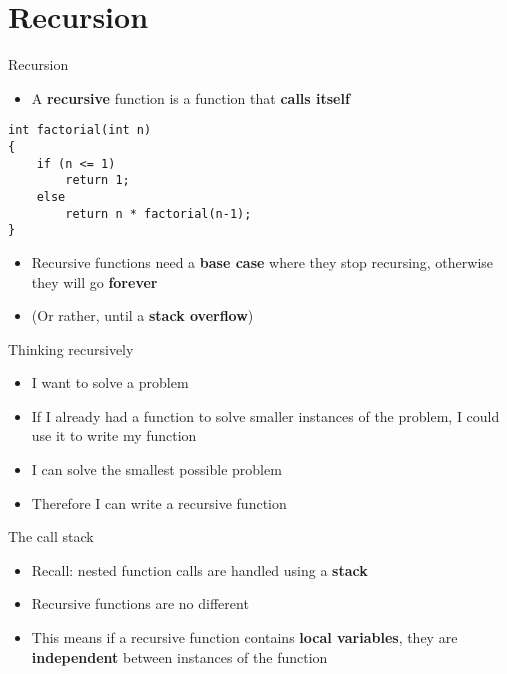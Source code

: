\part{Recursion}
\frame{\partpage}

\begin{frame}[fragile]{Recursion}
    \begin{itemize}
        \pause\item A \textbf{recursive} function is a function that \textbf{calls itself}
    \end{itemize}
    \pause
    \begin{lstlisting}
int factorial(int n)
{
    if (n <= 1)
        return 1;
    else
        return n * factorial(n-1);
}
    \end{lstlisting}
    \begin{itemize}
        \pause\item Recursive functions need a \textbf{base case} where they stop recursing,
			otherwise they will go \textbf{forever}
        \pause\item (Or rather, until a \textbf{stack overflow})
    \end{itemize}
\end{frame}

\begin{frame}{Thinking recursively}
	\begin{itemize}
		\pause\item I want to solve a problem
		\pause\item If I already had a function to solve smaller instances of the problem, I could use it
			to write my function
		\pause\item I can solve the smallest possible problem
		\pause\item Therefore I can write a recursive function
	\end{itemize}
\end{frame}

\begin{frame}{The call stack}
	\begin{itemize}
		\pause\item Recall: nested function calls are handled using a \textbf{stack}
		\pause\item Recursive functions are no different
		\pause\item This means if a recursive function contains \textbf{local variables},
			they are \textbf{independent} between instances of the function
	\end{itemize}
\end{frame}
